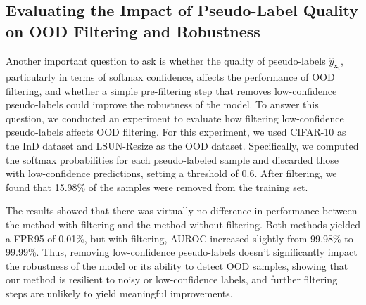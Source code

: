 \documentclass[10pt]{article} %
\theoremstyle{plain}
\theoremstyle{definition}
\begin{document}
\subsection{Evaluating the Impact of Pseudo-Label Quality on OOD Filtering and Robustness} \label{appendix:pseudo_label}
Another important question to ask is whether the quality of pseudo-labels \( \hat{y}_{\bm{\tilde{x}}_i}
\), particularly in terms of softmax confidence, affects the performance of OOD filtering, and whether a simple pre-filtering step that removes low-confidence pseudo-labels could improve the robustness of the model. To answer this question, we conducted an experiment to evaluate how filtering low-confidence pseudo-labels affects OOD filtering. For this experiment, we used CIFAR-10 as the InD dataset and LSUN-Resize as the OOD dataset.
Specifically, we computed the softmax probabilities for each pseudo-labeled sample and discarded those with low-confidence predictions, setting a threshold of 0.6. After filtering, we found that 15.98\% of the samples were removed from the training set.

The results showed that there was virtually no difference in performance between the method with filtering and the method without filtering. Both methods yielded a FPR95 of 0.01\%, but with filtering, AUROC increased slightly from 99.98\% to 99.99\%.
Thus, removing low-confidence pseudo-labels doesn't significantly impact the robustness of the model or its ability to detect OOD samples, showing that our method is resilient to noisy or low-confidence labels, and further filtering steps are unlikely to yield meaningful improvements.
\end{document}
